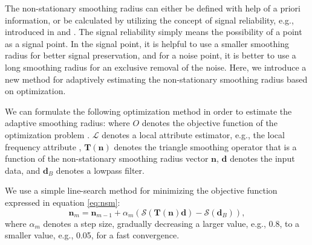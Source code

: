 The non-stationary smoothing radius can either be defined with help of a priori information, or be calculated by utilizing the concept of signal reliability, e.g., introduced in \cite{liuyang2009tvmf} and \cite{sosvmf}. The signal reliability simply means the possibility of a point as a signal point. In the signal point, it is helpful to use a smaller smoothing radius for better signal preservation, and for a noise point, it is better to use a long smoothing radius for an exclusive removal of the noise.  Here, we introduce a new method for adaptively estimating the non-stationary smoothing radius based on optimization. 

We can formulate the following optimization method in order to estimate the adaptive smoothing radius:
where $O$ denotes the objective function of the optimization problem \cite{greer2018matching}. $\mathcal{L}$ denotes a local attribute estimator, e.g., the local frequency attribute \cite{fomel2007localattr}, $\mathbf{T}(\mathbf{n})$ denotes the triangle smoothing operator that is a function of the non-stationary smoothing radius vector $\mathbf{n}$, $\mathbf{d}$ denotes the input data, and $\mathbf{d}_B$ denotes a lowpass filter. %


We use a simple line-search method for minimizing the objective function expressed in equation \ref{eq:nsm}:
\begin{equation}
\label{eq:nsm2}
\mathbf{n}_{m} = \mathbf{n}_{m-1} + \alpha_m \left( \mathcal{S}\left(\mathbf{T}(\mathbf{n})\mathbf{d}\right) - \mathcal{S}(\mathbf{d}_B) \right),
\end{equation}
where $\alpha_m$ denotes a step size, gradually decreasing a larger value, e.g., 0.8, to a smaller value, e.g., 0.05, for a fast convergence. 

